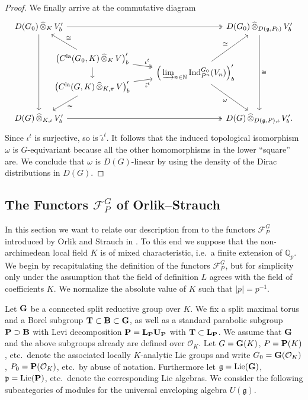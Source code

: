 \documentclass[a4paper, reqno, 10pt]{amsart}
\theoremstyle{definition}
\numberwithin{equation}{section}
\newcommand{\abs}[1]{{\lvert{#1}\rvert}}
\newcommand{\cotimes}[1]{{\,\widehat{\otimes}_{#1}\,}}
\newcommand{\Ind}{{\mathrm{Ind}}}
\newcommand{\indcotimes}{{\,\widehat{\otimes}_{K,\iota}\,}}
\newcommand{\la}{{\mathrm{la}}}
\newcommand{\projcotimes}{{\,\widehat{\otimes}_{K,\pi}\,}}
\newcommand{\BN}{{\mathbb {N}}}
\newcommand{\BQ}{{\mathbb {Q}}}
\newcommand{\CF}{{\mathcal {F}}}
\newcommand{\CO}{{\mathcal {O}}}
\newcommand{\bB}{{\mathrm{\bf B}}}
\newcommand{\bG}{{\mathrm{\bf G}}}
\newcommand{\bL}{{\mathrm{\bf L}}}
\newcommand{\bP}{{\mathrm{\bf P}}}
\newcommand{\bT}{{\mathrm{\bf T}}}
\newcommand{\bU}{{\mathrm{\bf U}}}
\newcommand{\Fg}{{\mathfrak {g}}}
\newcommand{\Fp}{{\mathfrak {p}}}
\begin{document}
\begin{proof}
	We finally arrive at the commutative diagram
	\begin{equation*}
		\begin{tikzcd}[column sep = tiny]
			D(G_0) \cotimes{K} V'_b \ar[rrr, two heads] \ar[dddd] &[-25pt] &[+17pt] &[-25pt] D(G_0) \cotimes{D(\Fg,P_0)} V'_b \ar[dddd, "\cong"] \\
			& \big( C^\la(G_0,K) \cotimes{K} V \big)'_b \ar[lu, "\cong"'] \ar[dd] \ar[rd, two heads, "\iota^t"] & &\\[-25pt]
			& &\Big( \varinjlim_{n\in \BN} \Ind_{P^n}^{G_0} (V_n) \Big)'_b \ar[ruu, "\cong"] \ar[rdd, "\omega"'] & \\[-25pt]
			& \big( C^\la(G,K) \projcotimes V \big)'_b \ar[ld, "\cong"] \ar[ru, "\tilde{\iota}^t"'] & &\\
			D(G) \indcotimes V'_b \ar[rrr, two heads] & & &D(G) \cotimes{D(\Fg,P),\iota} V'_b .
		\end{tikzcd}
	\end{equation*}
	Since $\iota^t$ is surjective, so is $\tilde{\iota}^t$. 
	It follows that the induced topological isomorphism $\omega$ is $G$-equivariant because all the other homomorphisms in the lower ``square'' are.
	We conclude that $\omega$ is $D(G)$-linear by using the density of the Dirac distributions in $D(G)$.
\end{proof}






\subsection{The Functors $\CF_P^G$ of Orlik--Strauch}\label{Sect - The Functors of Orlik--Strauch}


In this section we want to relate our description from  to the functors $\CF_P^G$ introduced by Orlik and Strauch in \cite{OrlikStrauch15JordanHoelderSerLocAnRep}.
To this end we suppose that the non-archimedean local field $K$ is of mixed characteristic, i.e.\ a finite extension of $\BQ_p$.
We begin by recapitulating the definition of the functors $\CF_P^G$, but for simplicity only under the assumption that the field of definition $L$ agrees with the field of coefficients $K$.
We normalize the absolute value of $K$ such that $\abs{p} = p^{-1}$.


Let $\bG$ be a connected split reductive group over $K$.
We fix a split maximal torus and a Borel subgroup $\bT \subset \bB \subset \bG$, as well as a standard parabolic subgroup $\bP \supset \bB$ with Levi decomposition $\bP = \bL_\bP \bU_\bP$ with $\bT \subset \bL_\bP$.
We assume that $\bG$ and the above subgroups already are defined over $\CO_K$.
Let $G=\bG(K)$, $P=\bP(K)$, etc.\ denote the associated locally $K$-analytic Lie groups and write $G_0 = \bG(\CO_K)$, $P_0 = \bP(\CO_K)$, etc.\ by abuse of notation.
Furthermore let $\Fg= {\rm Lie}(\bG)$, $\Fp = {\rm Lie}(\bP)$, etc.\ denote the corresponding Lie algebras.
We consider the following subcategories of modules for the universal enveloping algebra $U(\Fg)$.
\end{document}
